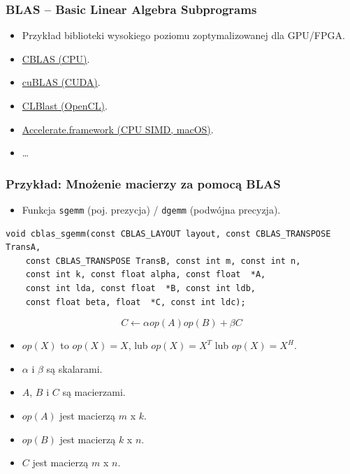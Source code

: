 \documentclass[dvipsnames,table]{beamer}
\begin{document}
\begin{frame}
	\frametitle{BLAS -- Basic Linear Algebra Subprograms} 
\begin{itemize}
	\item Przykład biblioteki wysokiego poziomu zoptymalizowanej dla GPU/FPGA.
	\item \href{http://www.netlib.org/blas/}{CBLAS (CPU)}.
	\item \href{https://docs.nvidia.com/cuda/cublas/index.html}{cuBLAS (CUDA)}.
	\item \href{https://github.com/CNugteren/CLBlast}{CLBlast (OpenCL)}.
	\item \href{https://developer.apple.com/documentation/accelerate/blas}{Accelerate.framework (CPU SIMD, macOS)}.
	\item \ldots
\end{itemize}
\end{frame}

\begin{frame}[fragile]
\frametitle{Przykład: Mnożenie macierzy za pomocą  BLAS}
\begin{itemize}
	\item Funkcja {\tt sgemm} (poj. prezycja) / {\tt dgemm} (podwójna precyzja).
\end{itemize}
\begin{lstlisting}
void cblas_sgemm(const CBLAS_LAYOUT layout, const CBLAS_TRANSPOSE TransA,
	const CBLAS_TRANSPOSE TransB, const int m, const int n,
	const int k, const float alpha, const float  *A,
	const int lda, const float  *B, const int ldb,
	const float beta, float  *C, const int ldc);
\end{lstlisting}
\[ C \leftarrow \alpha op(A) op(B) + \beta C \]
\begin{itemize}
	\item $op(X)$ to $op(X) = X$, lub $op(X) = X^T$ lub $op(X) = X^H$.
	\item $\alpha$ i $\beta$ są skalarami.
	\item $A$, $B$ i $C$ są macierzami.
	\item $op(A)$ jest macierzą $m$ x $k$.
	\item $op(B)$ jest macierzą $k$ x $n$.
	\item $C$ jest macierzą $m$ x $n$.
\end{itemize}
\end{frame}
\end{document}
